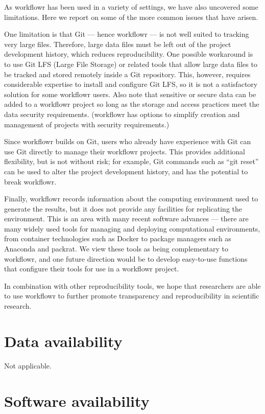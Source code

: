 \documentclass[9pt,a4paper]{extarticle}
\begin{document}
As workflowr has been used in a variety of settings, we have also
uncovered some limitations. Here we report on some of the more common
issues that have arisen.

One limitation is that Git --- hence workflowr --- is not well suited to
tracking very large files. Therefore, large data files must be left out
of the project development history, which reduces reproducibility. One
possible workaround is to use Git LFS (Large File Storage) or related
tools that allow large data files to be tracked and stored remotely
inside a Git repository. This, however, requires considerable expertise
to install and configure Git LFS, so it is not a satisfactory solution
for some workflowr users. Also note that sensitive or secure data can be
added to a workflowr project so long as the storage and access practices
meet the data security requirements. (workflowr has options to simplify
creation and management of projects with security requirements.)

Since workflowr builds on Git, users who already have experience with
Git can use Git directly to manage their workflowr projects. This
provides additional flexibility, but is not without risk; for example,
Git commands such as “git reset” can be used to alter the project
development history, and has the potential to break workflowr.

Finally, workflowr records information about the computing environment
used to generate the results, but it does not provide any facilities for
replicating the environment. This is an area with many recent software
advances --- there are many widely used tools for managing and deploying
computational environments, from container technologies such as Docker
to package managers such as Anaconda and packrat. We view these tools as
being complementary to workflowr, and one future direction would be to
develop easy-to-use functions that configure their tools for use in a
workflowr project.

In combination with other reproducibility tools, we hope that
researchers are able to use workflowr to further promote transparency
and reproducibility in scientific research.


\section*{Data availability}

Not applicable.


\section*{Software availability}
\end{document}
